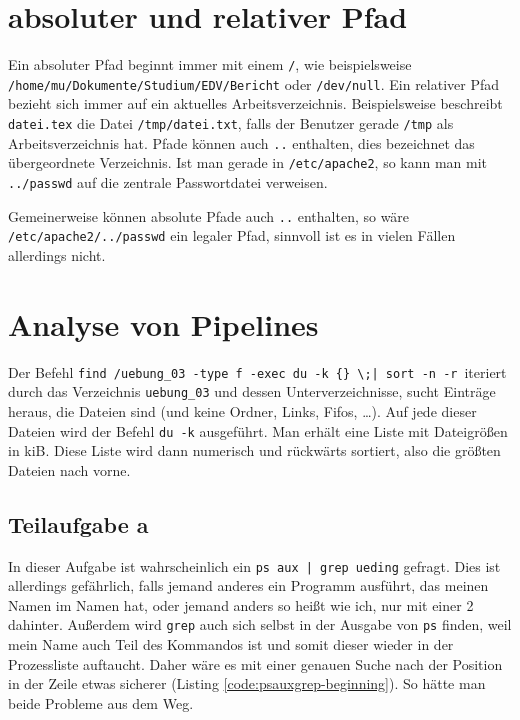 \section{absoluter und relativer Pfad}

Ein absoluter Pfad beginnt immer mit einem \texttt{/}, wie beispielsweise \\ \texttt{/home/mu/Dokumente/Studium/EDV/Bericht} oder \texttt{/dev/null}. Ein relativer Pfad bezieht sich immer auf ein aktuelles Arbeitsverzeichnis. Beispielsweise beschreibt \texttt{datei.tex} die Datei \texttt{/tmp/datei.txt}, falls der Benutzer gerade \texttt{/tmp} als Arbeitsverzeichnis hat. Pfade können auch \texttt{..} enthalten, dies bezeichnet das übergeordnete Verzeichnis. Ist man gerade in \texttt{/etc/apache2}, so kann man mit \texttt{../passwd} auf die zentrale Passwortdatei verweisen.

Gemeinerweise können absolute Pfade auch \texttt{..} enthalten, so wäre \\
\texttt{/etc/apache2/../passwd} ein legaler Pfad, sinnvoll ist es in vielen Fällen allerdings nicht.

\section{Analyse von Pipelines}

Der Befehl \verb#find /uebung_03 -type f -exec du -k {} \;| sort -n -r#\ iteriert durch das Verzeichnis \verb#uebung_03# und dessen Unterverzeichnisse, sucht Einträge heraus, die Dateien sind (und keine Ordner, Links, Fifos, …). Auf jede dieser Dateien wird der Befehl \texttt{du -k} ausgeführt. Man erhält eine Liste mit Dateigrößen in kiB. Diese Liste wird dann numerisch und rückwärts sortiert, also die größten Dateien nach vorne.

\subsection{Teilaufgabe a}
In dieser Aufgabe ist wahrscheinlich ein \verb#ps aux | grep ueding# gefragt. Dies ist allerdings gefährlich, falls jemand anderes ein Programm ausführt, das meinen Namen im Namen hat, oder jemand anders so heißt wie ich, nur mit einer 2 dahinter. Außerdem wird \texttt{grep} auch sich selbst in der Ausgabe von \texttt{ps} finden, weil mein Name auch Teil des Kommandos ist und somit dieser wieder in der Prozessliste auftaucht. Daher wäre es mit einer genauen Suche nach der Position in der Zeile etwas sicherer (Listing \ref{code:psauxgrep-beginning}). So hätte man beide Probleme aus dem Weg.

